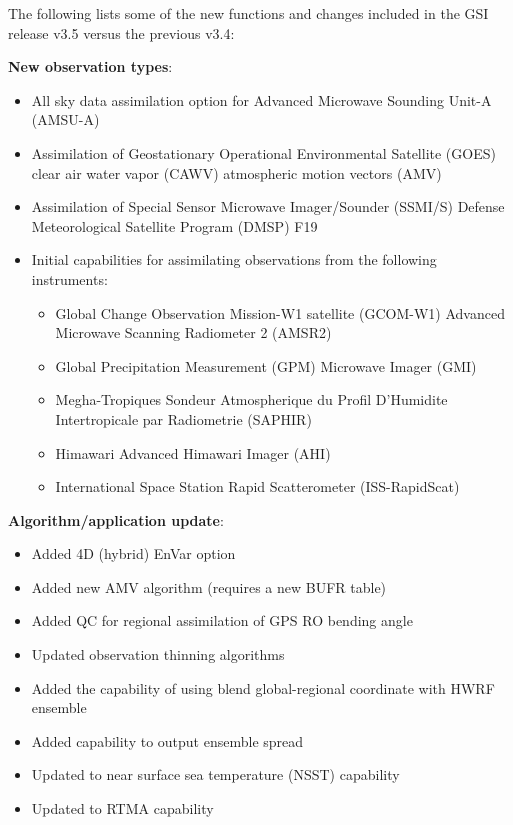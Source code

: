 The following lists some of the new functions and changes included in the GSI release v3.5 versus the previous v3.4:

\textbf{New observation types}:
\begin{itemize}
  \item All sky data assimilation option for Advanced Microwave Sounding Unit-A (AMSU-A)
  \item Assimilation of Geostationary Operational Environmental Satellite (GOES) clear air water vapor (CAWV) atmospheric motion vectors (AMV)
  \item Assimilation of Special Sensor Microwave Imager/Sounder (SSMI/S) Defense Meteorological Satellite Program (DMSP) F19
  \item Initial capabilities for assimilating observations from the following instruments: 
  \begin{itemize}
	\item Global Change Observation Mission-W1 satellite (GCOM-W1) Advanced Microwave Scanning Radiometer 2 (AMSR2)
	\item Global Precipitation Measurement (GPM) Microwave Imager (GMI)
	\item Megha-Tropiques Sondeur Atmospherique du Profil D'Humidite Intertropicale par Radiometrie (SAPHIR)
	\item Himawari Advanced Himawari Imager (AHI)
	\item International Space Station Rapid Scatterometer (ISS-RapidScat)
  \end{itemize}
\end{itemize}

\textbf{Algorithm/application update}:
\begin{itemize}
\item Added 4D (hybrid) EnVar option
\item Added new AMV algorithm (requires a new BUFR table)
\item Added QC for regional assimilation of GPS RO bending angle
\item Updated observation thinning algorithms
\item Added the capability of using blend global-regional coordinate with HWRF ensemble
\item Added capability to output ensemble spread
\item Updated to near surface sea temperature (NSST) capability
\item Updated to RTMA capability
\end{itemize}

